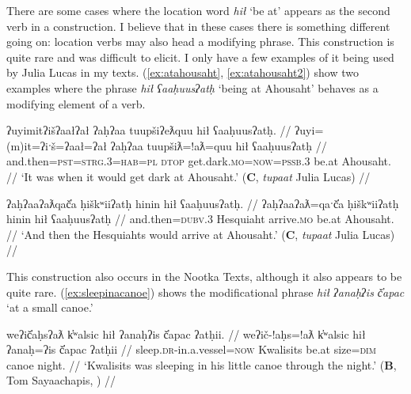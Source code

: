 
There are some cases where the location word \textit{hił} `be at' appears as the second verb in a construction. I believe that in these cases there is something different going on: location verbs may also head a modifying phrase. This construction is quite rare and was difficult to elicit. I only have a few examples of it being used by Julia Lucas in my texts. (\ref{ex:atahousaht}, \ref{ex:atahousaht2}) show two examples where the phrase \textit{hił ʕaaḥuusʔatḥ} `being at Ahousaht' behaves as a modifying element of a verb.

\ex \label{ex:atahousaht}
\begingl
\glpreamble ʔuyimitʔišʔaałʔał ʔaḥʔaa tuupšiʔeƛquu hił ʕaaḥuusʔatḥ. //
\gla ʔuyi=(m)it=ʔiˑš=ʔaał=ʔał ʔaḥʔaa tuupšiƛ=!aƛ=quu hił ʕaaḥuusʔatḥ  //
\glb and.then=\textsc{pst}=\textsc{strg.3}=\textsc{hab}=\textsc{pl} \textsc{dtop} get.dark.\textsc{mo}=\textsc{now}=\textsc{pssb.3} be.at Ahousaht. //
\glft `It was when it would get dark at Ahousaht.' (\textbf{C}, \textit{tupaat} Julia Lucas) //
\endgl
\xe

\ex \label{ex:atahousaht2}
\begingl
\glpreamble ʔaḥʔaaʔaƛqač̓a ḥiškʷiiʔatḥ hinin hił ʕaaḥuusʔatḥ. //
\gla ʔaḥʔaaʔaƛ=qaˑč̓a ḥiškʷiiʔatḥ hinin hił ʕaaḥuusʔatḥ  //
\glb and.then=\textsc{dubv.3} Hesquiaht arrive.\textsc{mo} be.at Ahousaht. //
\glft `And then the Hesquiahts would arrive at Ahousaht.' (\textbf{C}, \textit{tupaat} Julia Lucas) //
\endgl
\xe

This construction also occurs in the Nootka Texts, although it also appears to be quite rare. (\ref{ex:sleepinacanoe}) shows the modificational phrase \textit{hił ʔanaḥʔis č̓apac} `at a small canoe.' 

\ex \label{ex:sleepinacanoe}
\begingl
\glpreamble weʔič̓aḥsʔaƛ k̓ʷalsic hił ʔanaḥʔis č̓apac ʔatḥii. //
\gla weʔič-!aḥs=!aƛ k̓ʷalsic hił ʔanaḥ=ʔis č̓apac ʔatḥii  //
\glb sleep.\textsc{dr}-in.a.vessel=\textsc{now} Kwalisits be.at size=\textsc{dim} canoe night. //
\glft `Kwalisits was sleeping in his little canoe through the night.' (\textbf{B}, Tom Sayaachapis, \cite[3]{sapir1924}) //
\endgl
\xe

